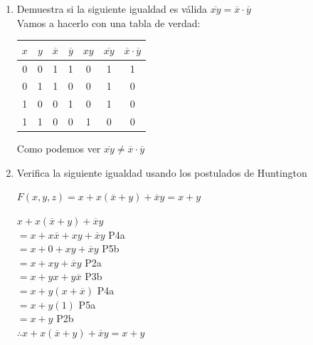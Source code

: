 \documentclass[a4paper,12pt]{article}
\begin{document}
\begin{enumerate}[label=\textcolor{teal}{\textbf{\arabic*.}}]
    \item  Demuestra si la siguiente igualdad es válida $\overline{xy}=\overline{x} \cdot \overline{y}$\\
    Vamos a hacerlo con una tabla de verdad:\\
    \begin{center}
        \begin{tabular}{|c|c|c|c|c|c|c|}
            \hline
            $x$ & $y$ & $\overline{x}$ & $\overline{y}$ & $xy$ & $\overline{xy}$ & $\overline{x} \cdot \overline{y}$ \\ \hline
            0 & 0 & 1 & 1 & 0 & 1 & 1 \\ \hline
            0 & 1 & 1 & 0 & 0 & 1 & 0 \\ \hline
            1 & 0 & 0 & 1 & 0 & 1 & 0 \\ \hline
            1 & 1 & 0 & 0 & 1 & 0 & 0 \\ \hline
        \end{tabular}
    \end{center}
    Como podemos ver $\overline{xy} \neq \overline{x} \cdot \overline{y}$\\
        
        

    \item Verifica la siguiente igualdad usando los postulados de Huntington
            \begin{center}
                $F(x,y,z) = x + x(\overline{x} + y) + \overline{x} y = x + y$
            \end{center}

            $x + x(\overline{x} + y) + \overline{x} y$\\
            $= x + x\overline{x} + xy + \overline{x} y$ P4a\\
            $= x + 0 + xy + \overline{x} y$ P5b\\
            $= x + xy + \overline{x} y$ P2a\\
            $= x + yx + y\overline{x} $ P3b\\
            $= x + y(x + \overline{x}) $ P4a\\
            $= x + y(1) $ P5a\\
            $= x + y $ P2b\\

            $ \therefore x + x(\overline{x} + y) + \overline{x} y = x + y$\\
           

\end{enumerate}
\end{document}
